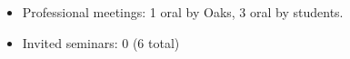 \begin{itemize}
    \item Professional meetings: 1 oral by Oaks, 3 oral by students.
    \item Invited seminars: 0 (6 total)
\end{itemize}
